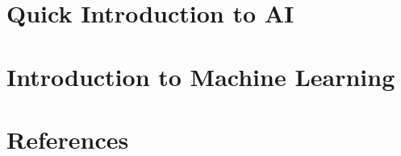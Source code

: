 \section[AI]{Quick Introduction to AI}


\section[ML]{Introduction to Machine Learning}


\section[Refs]{References}


